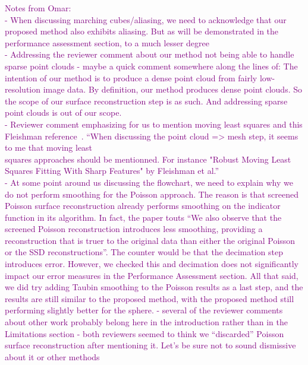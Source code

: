 \textcolor{purple}{
Notes from Omar:\\
- When discussing marching cubes/aliasing, we need to acknowledge that our proposed method also exhibits aliasing. But as will be demonstrated in the performance assessment section, to a much lesser degree\\
- Addressing the reviewer comment about our method not being able to handle sparse point clouds - maybe a quick comment somewhere along the lines of: The intention of our method is to produce a dense point cloud from fairly low-resolution image data. By definition, our method produces dense point clouds. So the scope of our surface reconstruction step is as such. And addressing sparse point clouds is out of our scope.\\
- Reviewer comment emphasizing for us to mention moving least squares and this Fleishman reference~\cite{fleishman2005}. ``When discussing the point cloud => mesh step, it seems to me that moving least\\
squares approaches should be mentionned. For instance "Robust Moving Least
Squares Fitting With Sharp Features" by Fleishman et al.''\\
- At some point around us discussing the flowchart, we need to explain why we do not perform smoothing for the Poisson approach. The reason is that screened Poisson surface reconstruction already performs smoothing on the indicator function in its algorithm. In fact, the paper touts ``We also observe that the screened Poisson reconstruction introduces less smoothing, providing a reconstruction that is truer to the original data than either the original Poisson or the SSD reconstructions''. The counter would be that the decimation step introduces error. However, we checked this and decimation does not significantly impact our error measures in the Performance Assessment section. All that said, we did try adding Taubin smoothing to the Poisson results as a last step, and the results are still similar to the proposed method, with the proposed method still performing slightly better for the sphere.
- several of the reviewer comments about other work probably belong here in the introduction rather than in the Limitations section
- both reviewers seemed to think we ``discarded'' Poisson surface reconstruction after mentioning it. Let's be sure not to sound dismissive about it or other methods}